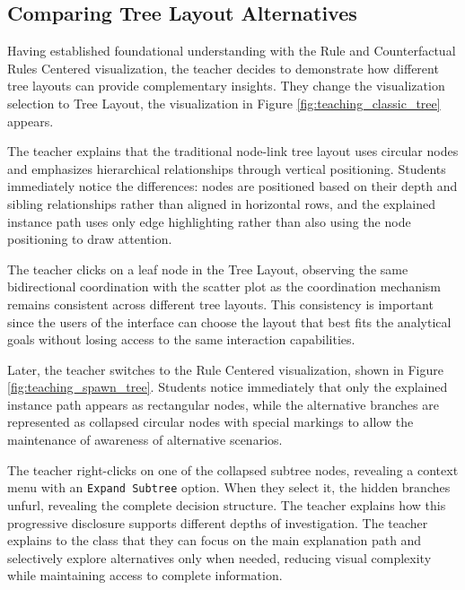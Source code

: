 \subsection{Comparing Tree Layout Alternatives}

Having established foundational understanding with the Rule and Counterfactual Rules Centered visualization, the teacher decides to demonstrate how different tree layouts can provide complementary insights. They change the visualization selection to Tree Layout, the visualization in Figure \ref{fig:teaching_classic_tree} appears.

The teacher explains that the traditional node-link tree layout uses circular nodes and emphasizes hierarchical relationships through vertical positioning. Students immediately notice the differences: nodes are positioned based on their depth and sibling relationships rather than aligned in horizontal rows, and the explained instance path uses only edge highlighting rather than also using the node positioning to draw attention.

The teacher clicks on a leaf node in the Tree Layout, observing the same bidirectional coordination with the scatter plot as the coordination mechanism remains consistent across different tree layouts. This consistency is important since the users of the interface can choose the layout that best fits the analytical goals without losing access to the same interaction capabilities.

Later, the teacher switches to the Rule Centered visualization, shown in Figure \ref{fig:teaching_spawn_tree}. Students notice immediately that only the explained instance path appears as rectangular nodes, while the alternative branches are represented as collapsed circular nodes with special markings to allow the maintenance of awareness of alternative scenarios. 

The teacher right-clicks on one of the collapsed subtree nodes, revealing a context menu with an \texttt{Expand Subtree} option. When they select it, the hidden branches unfurl, revealing the complete decision structure. The teacher explains how this progressive disclosure supports different depths of investigation. The teacher explains to the class that they can focus on the main explanation path and selectively explore alternatives only when needed, reducing visual complexity while maintaining access to complete information.

